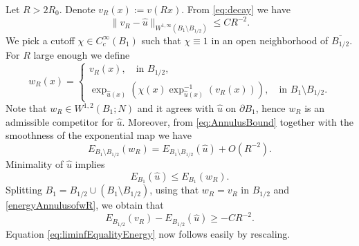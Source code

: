\documentclass[11pt]{article}
\theoremstyle{plain}
\numberwithin{equation}{section}
\theoremstyle{definition}
\let\oldendproof\endproof
\renewenvironment{proof}[1][\proofname]{%
\oldproof[\upshape \bfseries #1]%
}{\oldendproof}
\def \p{\partial}
\begin{document}
\begin{proof}
    Let $R>2R_0$. Denote $v_R(x):=v(Rx)$. From \eqref{eq:decay} we have
    \begin{equation}
        \label{eq:AnnulusBound}
        \|v_R-\hat u\|_{W^{1,\infty}(B_1\setminus B_{1/2})}\leq C R^{-2}.
    \end{equation}
    We pick a cutoff $\chi \in C_c^\infty(B_1)$ such that $\chi \equiv 1$ in an open neighborhood of $\overline {B_{1/2}}$. For $R$ large enough we define
    \[
    w_R(x)=\begin{cases}
        v_R(x),\quad \text{in }B_{1/2},\\
        \exp_{\hat u(x)}(\chi(x)\exp_{\hat u(x)}^{-1}(v_R(x))),\quad \text{in }B_1\setminus B_{1/2}.
    \end{cases}
    \]
    Note that $w_R \in W^{1,2}(B_1;N)$ and it agrees with $\hat u$ on $\p B_1$, hence $w_R$ is an admissible competitor for $\hat u$. Moreover, from \eqref{eq:AnnulusBound} together with the smoothness of the exponential map we have
    \begin{equation}
        \label{energyAnnulusofwR}
        E_{B_1\setminus B_{1/2}}(w_R)=E_{B_1\setminus B_{1/2}}(\hat u)+O(R^{-2}).
    \end{equation}
    Minimality of $\hat u$ implies
    \[
    E_{B_1}(\hat u)\leq E_{B_1}(w_R).
    \]
    Splitting $B_1=B_{1/2}\cup (B_{1}\setminus B_{1/2})$, using that $w_R=v_R$ in $B_{1/2}$ and \eqref{energyAnnulusofwR}, we obtain that
    \begin{equation}
        E_{B_{1/2}}(v_R)-E_{B_{1/2}}(\hat u)\geq -CR^{-2}.
    \end{equation}
    Equation \eqref{eq:liminfEqualityEnergy} now follows easily by rescaling.
\end{proof}
\end{document}

